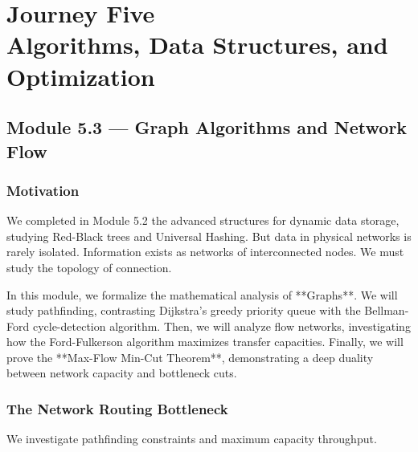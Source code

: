 \documentclass[12pt, a4paper]{book}
\begin{document}
\setcounter{chapter}{4}
\chapter[Journey 5 --- Algorithms, Data Structures, and Optimization]
        {Journey Five\\[8pt]
         \textcolor{ModuleColor}{\large Algorithms, Data Structures, and Optimization}}
\setcounter{section}{2}

\section{Module 5.3 --- Graph Algorithms and Network Flow}
\label{sec:mod5.3}

\subsection*{Motivation}

We completed in Module 5.2 the advanced structures for dynamic data storage, studying Red-Black trees and Universal Hashing.
But data in physical networks is rarely isolated.
Information exists as networks of interconnected nodes.
We must study the topology of connection.

In this module, we formalize the mathematical analysis of **Graphs**.
We will study pathfinding, contrasting Dijkstra's greedy priority queue with the Bellman-Ford cycle-detection algorithm.
Then, we will analyze flow networks, investigating how the Ford-Fulkerson algorithm maximizes transfer capacities.
Finally, we will prove the **Max-Flow Min-Cut Theorem**, demonstrating a deep duality between network capacity and bottleneck cuts.

\subsection{The Network Routing Bottleneck}

We investigate pathfinding constraints and maximum capacity throughput.
\end{document}

